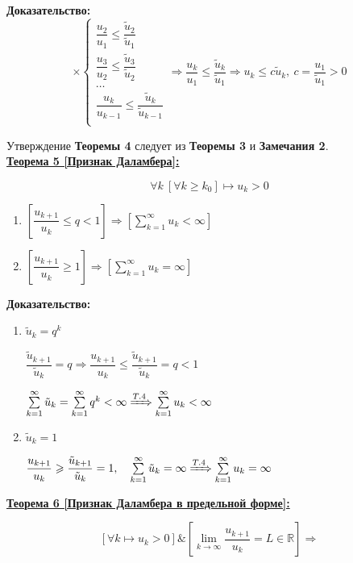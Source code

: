 \documentclass[a4paper,12pt]{article} %
\newcommand{\R}{\mathbb{R}}
\newcommand{\series}{\sum\limits_{k=1}^{\infty}}
\newcommand{\useriesl}{\sum\limits_{k=1}^{\infty} u_k < \infty}
\newcommand{\useriese}{\sum\limits_{k=1}^{\infty} u_k = \infty}
\begin{document}
\textbf{Доказательство:}
\begin{equation*}
	\times
	\begin{cases}
		\dfrac{u_2}{u_1} \leqslant \dfrac{\tilde{u}_2}{\tilde{u}_1} \\
		\dfrac{u_3}{u_2} \leqslant \dfrac{\tilde{u}_3}{\tilde{u}_2} \\
		\dots \\
		\dfrac{u_k}{u_{k-1}} \leqslant \dfrac{\tilde{u}_k}{\tilde{u}_{k-1}} \\
	\end{cases}
	\Rightarrow \dfrac{u_k}{u_1} \leqslant \dfrac{\tilde{u}_k}{\tilde{u}_1} \Rightarrow u_k \leqslant c\tilde{u}_k, ~c = \dfrac{u_1}{\tilde{u}_1} > 0
\end{equation*}

Утверждение \textbf{Теоремы 4} следует из \textbf{Теоремы 3} и \textbf{Замечания 2}.\\

\underline{\textbf{Теорема 5 [Признак Даламбера]:}}

$$\forall k \ [\forall k \geqslant k_0] \mapsto u_k > 0$$

\begin{enumerate}
	\item $ \left[ \dfrac{u_{k+1}}{u_k} \leqslant q < 1 \right] \Rightarrow \left[ \useriesl \right]$
	\item $ \left[ \dfrac{u_{k+1}}{u_k} \geqslant 1 \right] \Rightarrow \left[ \useriese \right]$
\end{enumerate}

\textbf{Доказательство:}
\begin{enumerate}
	\item $\tilde{u}_k = q^k$
	
	$\dfrac{\tilde{u}_{k+1}}{\tilde{u}_k} = q \Rightarrow \dfrac{u_{k+1}}{u_k} \leqslant \dfrac{\tilde{u}_{k+1}}{\tilde{u}_k} = q < 1$
	
	$\series \tilde{u}_k = \series q^k < \infty \xRightarrow{T.4} \useriesl$
	\item $\tilde{u}_k = 1$
	
	$\dfrac{u_{k+1}}{u_k} \geqslant \dfrac{\tilde{u}_{k+1}}{\tilde{u}_k} = 1, \hspace{1em} \series \tilde{u}_k = \infty \xRightarrow[]{T.4} \useriese$
\end{enumerate}

\underline{\textbf{Теорема 6 [Признак Даламбера в предельной форме]:}}

$$\left[ \forall k \mapsto u_k > 0 \right] \& \left[ \lim\limits_{k \to \infty} \dfrac{u_{k+1}}{u_k} = L \in \R \right] \Rightarrow$$
\end{document}
